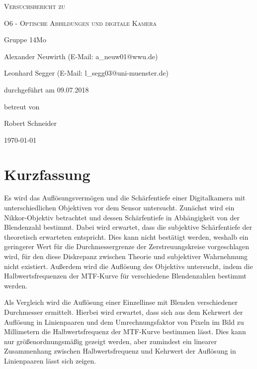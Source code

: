 \documentclass[
	a4paper,
	12pt,
	pagesize,
	ngerman
]{scrartcl}
\begin{document}
	
	\begin{titlepage}
		\centering
		{\scshape\LARGE Versuchsbericht zu \par}
		\vspace{1cm}
		{\scshape\huge O6 - Optische Abbildungen und digitale Kamera \par}
		\vspace{2.5cm}
		{\LARGE Gruppe 14Mo \par}
		\vspace{0.5cm}
		
		{\large Alexander Neuwirth (E-Mail: a\_neuw01@wwu.de) \par}
		{\large Leonhard Segger (E-Mail: l\_segg03@uni-muenster.de) \par}
		\vfill
		
		durchgeführt am 09.07.2018\par
		betreut von\par
		{\large Robert Schneider} 
		
		\vfill
		
		{\large \today\par}
	\end{titlepage}
	\tableofcontents
	\newpage


	\section{Kurzfassung}
	Es wird das Auflösungsvermögen und die Schärfentiefe einer Digitalkamera mit unterschiedlichen Objektiven vor dem Sensor untersucht.
	Zunächst wird ein Nikkor-Objektiv betrachtet und dessen Schärfentiefe in Abhängigkeit von der Blendenzahl bestimmt.
	Dabei wird erwartet, dass die subjektive Schärfentiefe der theoretisch erwarteten entspricht.
	Dies kann nicht bestätigt werden, weshalb ein geringerer Wert für die Durchmessergrenze der Zerstreuungskreise vorgeschlagen wird, für den diese Diskrepanz zwischen Theorie und subjektiver Wahrnehmung nicht existiert.
	Außerdem wird die Auflösung des Objektivs untersucht, indem die Halbwertsfrequenzen der MTF-Kurve für verschiedene Blendenzahlen bestimmt werden.
	
	Als Vergleich wird die Auflösung einer Einzellinse mit Blenden verschiedener Durchmesser ermittelt.
	Hierbei wird erwartet, dass sich aus dem Kehrwert der Auflösung in Linienpaaren und dem Umrechnungsfaktor von Pixeln im Bild zu Millimetern die Halbwertsfrequenz der MTF-Kurve bestimmen lässt.
	Dies kann nur größenordnungsmäßig gezeigt werden, aber zumindest ein linearer Zusammenhang zwischen Halbwertsfrequenz und Kehrwert der Auflösung in Linienpaaren lässt sich zeigen.
	
\end{document}

